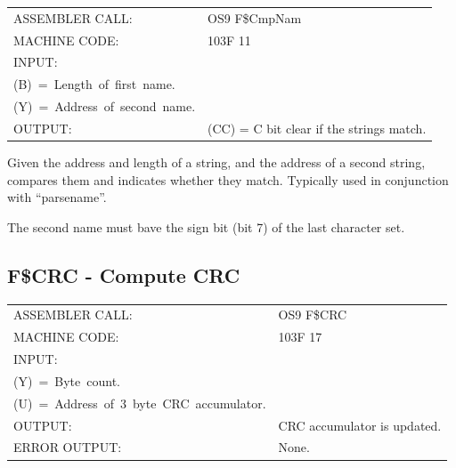 \documentclass[
]{article}
\newcounter{none} %
\begin{document}
{\def\LTcaptype{none} %
\begin{longtable}[]{@{}
  >{\raggedright\arraybackslash}p{}
  >{\raggedright\arraybackslash}p{}@{}}
\toprule\noalign{}
\endhead
\bottomrule\noalign{}
\endlastfoot
ASSEMBLER CALL: & OS9 F\$CmpNam \\
MACHINE CODE: & 103F 11 \\
INPUT: & \begin{minipage}[t]{\linewidth}\raggedright
(X)~=~Address~of~first~name.\\
(B)~=~Length~of~first~name.\\
(Y)~=~Address~of~second~name.
\end{minipage} \\
OUTPUT: & (CC) = C bit clear if the strings match. \\
\end{longtable}
}

Given the address and length of a string, and the address of a second
string, compares them and indicates whether they match. Typically used
in conjunction with ``parsename''.

The second name must bave the sign bit (bit 7) of the last character
set.

\subsection{F\$CRC - Compute CRC}\label{f.crc}

{\def\LTcaptype{none} %
\begin{longtable}[]{@{}
  >{\raggedright\arraybackslash}p{}
  >{\raggedright\arraybackslash}p{}@{}}
\toprule\noalign{}
\endhead
\bottomrule\noalign{}
\endlastfoot
ASSEMBLER CALL: & OS9 F\$CRC \\
MACHINE CODE: & 103F 17 \\
INPUT: & \begin{minipage}[t]{\linewidth}\raggedright
(X)~=~Starting~byte~address.\\
(Y)~=~Byte~count.\\
(U)~=~Address~of~3~byte~CRC~accumulator.
\end{minipage} \\
OUTPUT: & CRC accumulator is updated. \\
ERROR OUTPUT: & None. \\
\end{longtable}
}
\end{document}
